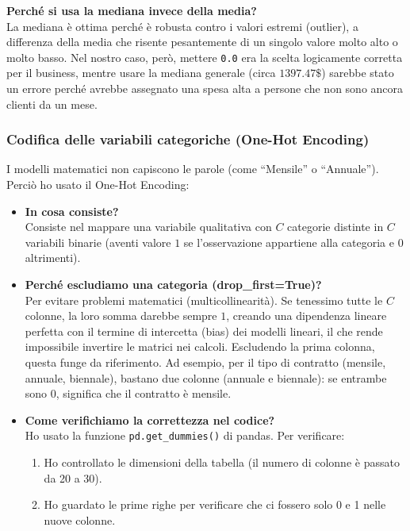 \documentclass[a4paper,11pt]{article}
\begin{document}
\textbf{Perché si usa la mediana invece della media?}\\
La mediana è ottima perché è robusta contro i valori estremi (outlier), a differenza della media che risente pesantemente di un singolo valore molto alto o molto basso. Nel nostro caso, però, mettere \texttt{0.0} era la scelta logicamente corretta per il business, mentre usare la mediana generale (circa $1397.47\$$) sarebbe stato un errore perché avrebbe assegnato una spesa alta a persone che non sono ancora clienti da un mese.

\subsubsection{Codifica delle variabili categoriche (One-Hot Encoding)}
I modelli matematici non capiscono le parole (come ``Mensile'' o ``Annuale''). Perciò ho usato il One-Hot Encoding:
\begin{itemize}
    \item \textbf{In cosa consiste?}\\
    Consiste nel mappare una variabile qualitativa con $C$ categorie distinte in $C$ variabili binarie (aventi valore $1$ se l'osservazione appartiene alla categoria e $0$ altrimenti).
    \item \textbf{Perché escludiamo una categoria (drop\_first=True)?}\\
    Per evitare problemi matematici (multicollinearità). Se tenessimo tutte le $C$ colonne, la loro somma darebbe sempre $1$, creando una dipendenza lineare perfetta con il termine di intercetta (bias) dei modelli lineari, il che rende impossibile invertire le matrici nei calcoli. Escludendo la prima colonna, questa funge da riferimento. Ad esempio, per il tipo di contratto (mensile, annuale, biennale), bastano due colonne (annuale e biennale): se entrambe sono 0, significa che il contratto è mensile.
    \item \textbf{Come verifichiamo la correttezza nel codice?}\\
    Ho usato la funzione \texttt{pd.get\_dummies()} di pandas. Per verificare:
    \begin{enumerate}
        \item Ho controllato le dimensioni della tabella (il numero di colonne è passato da 20 a 30).
        \item Ho guardato le prime righe per verificare che ci fossero solo 0 e 1 nelle nuove colonne.
    \end{enumerate}
\end{itemize}
\end{document}
